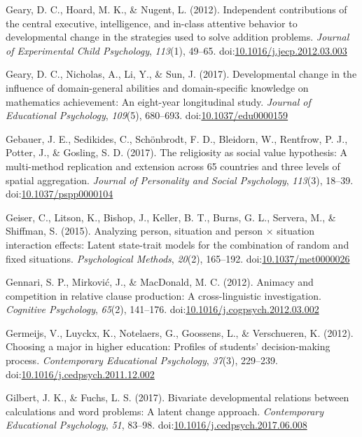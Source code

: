 \documentclass[english,man]{apa6}
\theoremstyle{definition}
\theoremstyle{definition}
\theoremstyle{definition}
\theoremstyle{remark}
\begin{document}
\hypertarget{ref-Geary2012}{}
Geary, D. C., Hoard, M. K., \& Nugent, L. (2012). Independent
contributions of the central executive, intelligence, and in-class
attentive behavior to developmental change in the strategies used to
solve addition problems. \emph{Journal of Experimental Child
Psychology}, \emph{113}(1), 49--65.
doi:\href{https://doi.org/10.1016/j.jecp.2012.03.003}{10.1016/j.jecp.2012.03.003}

\hypertarget{ref-Geary2017}{}
Geary, D. C., Nicholas, A., Li, Y., \& Sun, J. (2017). Developmental
change in the influence of domain-general abilities and domain-specific
knowledge on mathematics achievement: An eight-year longitudinal study.
\emph{Journal of Educational Psychology}, \emph{109}(5), 680--693.
doi:\href{https://doi.org/10.1037/edu0000159}{10.1037/edu0000159}

\hypertarget{ref-Gebauer2016}{}
Gebauer, J. E., Sedikides, C., Schönbrodt, F. D., Bleidorn, W.,
Rentfrow, P. J., Potter, J., \& Gosling, S. D. (2017). The religiosity
as social value hypothesis: A multi-method replication and extension
across 65 countries and three levels of spatial aggregation.
\emph{Journal of Personality and Social Psychology}, \emph{113}(3),
18--39.
doi:\href{https://doi.org/10.1037/pspp0000104}{10.1037/pspp0000104}

\hypertarget{ref-Geiser2015}{}
Geiser, C., Litson, K., Bishop, J., Keller, B. T., Burns, G. L.,
Servera, M., \& Shiffman, S. (2015). Analyzing person, situation and
person × situation interaction effects: Latent state-trait models for
the combination of random and fixed situations. \emph{Psychological
Methods}, \emph{20}(2), 165--192.
doi:\href{https://doi.org/10.1037/met0000026}{10.1037/met0000026}

\hypertarget{ref-Gennari2012}{}
Gennari, S. P., Mirković, J., \& MacDonald, M. C. (2012). Animacy and
competition in relative clause production: A cross-linguistic
investigation. \emph{Cognitive Psychology}, \emph{65}(2), 141--176.
doi:\href{https://doi.org/10.1016/j.cogpsych.2012.03.002}{10.1016/j.cogpsych.2012.03.002}

\hypertarget{ref-Germeijs2012}{}
Germeijs, V., Luyckx, K., Notelaers, G., Goossens, L., \& Verschueren,
K. (2012). Choosing a major in higher education: Profiles of students'
decision-making process. \emph{Contemporary Educational Psychology},
\emph{37}(3), 229--239.
doi:\href{https://doi.org/10.1016/j.cedpsych.2011.12.002}{10.1016/j.cedpsych.2011.12.002}

\hypertarget{ref-Gilbert2017}{}
Gilbert, J. K., \& Fuchs, L. S. (2017). Bivariate developmental
relations between calculations and word problems: A latent change
approach. \emph{Contemporary Educational Psychology}, \emph{51}, 83--98.
doi:\href{https://doi.org/10.1016/j.cedpsych.2017.06.008}{10.1016/j.cedpsych.2017.06.008}
\end{document}
